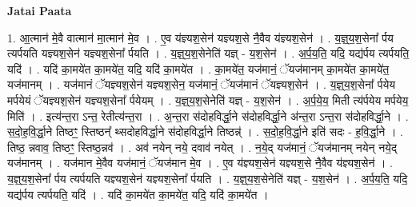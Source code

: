 \documentclass[17pt]{extarticle}
\begin{document}
\textbf{Jatai Paata} \newline

1. आ॒त्मान॑ मे॒वै वात्मान॑ मा॒त्मान॑ मे॒व । . ए॒व य॑ज्ञ्यश॒सेन॑ यज्ञ्यश॒से नै॒वैव य॑ज्ञ्यश॒सेन॑ । . य॒ज्ञ्॒य॒श॒सेना᳚ र्पय त्यर्पयति यज्ञ्यश॒सेन॑ यज्ञ्यश॒सेना᳚ र्पयति । . य॒ज्ञ्॒य॒श॒सेनेति॑ यज्ञ् - य॒श॒सेन॑ । . अ॒र्प॒य॒ति॒ यदि॒ यद्य॑र्पय त्यर्पयति॒ यदि॑ । . यदि॑ का॒मये॑त का॒मये॑त॒ यदि॒ यदि॑ का॒मये॑त । . का॒मये॑त॒ यज॑मानं॒ ॅयज॑मानम् का॒मये॑त का॒मये॑त॒ यज॑मानम् । . यज॑मानं ॅयज्ञ्यश॒सेन॑ यज्ञ्यश॒सेन॒ यज॑मानं॒ ॅयज॑मानं ॅयज्ञ्यश॒सेन॑ । . य॒ज्ञ्॒य॒श॒सेना᳚ र्पयेय मर्पयेयं ॅयज्ञ्यश॒सेन॑ यज्ञ्यश॒सेना᳚ र्पयेयम् । . य॒ज्ञ्॒य॒श॒सेनेति॑ यज्ञ् - य॒श॒सेन॑ । . अ॒र्प॒ये॒य॒ मिती त्य॑र्पयेय मर्पयेय॒ मिति॑ । . इत्य॑न्त॒रा ऽन्त॒ रेतीत्य॑न्त॒रा । . अ॒न्त॒रा स॑दोहविर्द्धा॒ने स॑दोहविर्द्धा॒ने अ॑न्त॒रा ऽन्त॒रा स॑दोहविर्द्धा॒ने । . स॒दो॒ह॒वि॒र्द्धा॒ने तिष्ठꣳ॒॒ स्तिष्ठन्᳚ थ्सदोहविर्द्धा॒ने स॑दोहविर्द्धा॒ने तिष्ठन्न्॑ । . स॒दो॒ह॒वि॒र्द्धा॒ने इति॑ सदः - ह॒वि॒र्द्धा॒ने । . तिष्ठ॒ न्नवाव॒ तिष्ठꣳ॒॒ स्तिष्ठ॒न्नव॑ । . अव॑ नयेन् नये॒ दवाव॑ नयेत् । . न॒ये॒द् यज॑मानं॒ ॅयज॑मानम् नयेन् नये॒द् यज॑मानम् । . यज॑मान मे॒वैव यज॑मानं॒ ॅयज॑मान मे॒व । . ए॒व य॑ज्ञ्यश॒सेन॑ यज्ञ्यश॒से नै॒वैव य॑ज्ञ्यश॒सेन॑ । . य॒ज्ञ्॒य॒श॒सेना᳚ र्पय त्यर्पयति यज्ञ्यश॒सेन॑ यज्ञ्यश॒सेना᳚ र्पयति । . य॒ज्ञ्॒य॒श॒सेनेति॑ यज्ञ् - य॒श॒सेन॑ । . अ॒र्प॒य॒ति॒ यदि॒ यद्य॑र्पय त्यर्पयति॒ यदि॑ । . यदि॑ का॒मये॑त का॒मये॑त॒ यदि॒ यदि॑ का॒मये॑त । \newline
\end{document}
